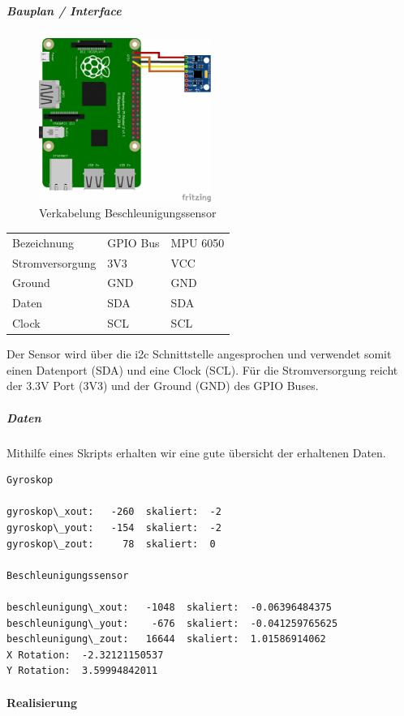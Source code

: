 \documentclass[../../main.tex]{subfiles}
\begin{document}
\subparagraph{Bauplan / Interface}
\begin{figure}[H] \centering
  \includegraphics[width=0.5\textwidth, angle=90]{Verkabelung_BeschlSensor}
  \caption{Verkabelung Beschleunigungssensor}
  \label{fig:Beschleunigungssensor}
\end{figure}

\begin{table}[] \centering
\begin{tabular}{lll}
Bezeichnung     & GPIO Bus & MPU 6050 \\
Stromversorgung & 3V3      & VCC      \\
Ground          & GND      & GND      \\
Daten          & SDA      & SDA      \\
Clock          & SCL      & SCL
\end{tabular}
\end{table}

Der Sensor wird über die i2c Schnittstelle angesprochen und verwendet somit einen Datenport (SDA) und eine Clock (SCL). Für die Stromversorgung reicht der 3.3V Port (3V3) und der Ground (GND) des GPIO Buses.

\subparagraph{Daten}
Mithilfe eines Skripts erhalten wir eine gute übersicht der erhaltenen Daten.

\begin{lstlisting}
Gyroskop

gyroskop\_xout:   -260  skaliert:  -2
gyroskop\_yout:   -154  skaliert:  -2
gyroskop\_zout:     78  skaliert:  0

Beschleunigungssensor

beschleunigung\_xout:   -1048  skaliert:  -0.06396484375
beschleunigung\_yout:    -676  skaliert:  -0.041259765625
beschleunigung\_zout:   16644  skaliert:  1.01586914062
X Rotation:  -2.32121150537
Y Rotation:  3.59994842011
\end{lstlisting}

\paragraph{Realisierung}
\end{document}
